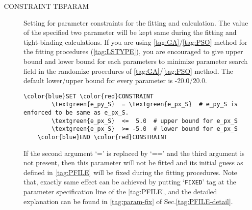 \documentclass[a4paper,12pt]{scrartcl}
\makeatletter
\def\namedlabel#1#2{\begingroup
    #2%
    \def\@currentlabel{#2}%
    \phantomsection\label{#1}\endgroup
}
\newcommand{\textgreen}[1]{\textcolor{green!50!black}{\texttt{#1}}}
\makeatother
\begin{document}
\begin{description}
 
 	\item[\namedlabel{tag:CONSTRAINT}{CONSTRAINT TBPARAM}] 
		Setting for parameter constraints for the fitting and calculation.
		The value of the specified two parameter will be kept same during the
		fitting and tight-binding calculations. 
		If you are using \ref{tag:GA}/\ref{tag:PSO} method for the fitting procedures (\ref{tag:LSTYPE}), you are encouraged to give upper bound and lower bound for each parameters to minimize parameter search field in the randomize procedures of \ref{tag:GA}/\ref{tag:PSO} method. The default lower/upper bound for every parameter is -20.0/20.0. %

 \begin{Verbatim}[commandchars=\\\{\},gobble=4, frame=single, framesep=2mm, 
    label= CONSTRAINT setup example,
    labelposition=bottomline]
    \color{blue}SET \color{red}CONSTRAINT
        \textgreen{e_py_S}  = \textgreen{e_px_S}  # e_py_S is enforced to be same as e_px_S. 
        \textgreen{e_px_S}  <=  5.0  # upper bound for e_px_S  
        \textgreen{e_px_S}  >= -5.0  # lower bound for e_px_S 
    \color{blue}END \color{red}CONSTRAINT
 \end{Verbatim} 
		If the second argument `=' is replaced by `==' and the third argument 
		is not present, then this parameter will not be fitted and its initial
		guess as defined in \ref{tag:PFILE} will be fixed during the fitting procedures.
		Note that, exactly same effect can be achieved by putting `\texttt{FIXED}' tag
		at the parameter specification line of the \ref{tag:PFILE}, and the detailed 
		explanation can be found in \ref{tag:param-fix} of Sec.\ref{tag:PFILE-detail}.
		

\end{description}
\end{document}
